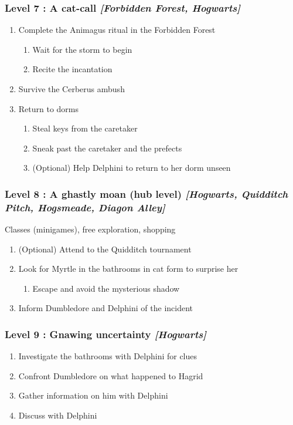 \subsubsection{Level 7 : A cat-call \textit{[Forbidden Forest, Hogwarts]}}
\begin{enumerate}[1)]
	\item Complete the Animagus ritual in the Forbidden Forest
	\begin{enumerate}[1.]
		\item Wait for the storm to begin
		\item Recite the incantation
	\end{enumerate}
	\item Survive the Cerberus ambush
	\item Return to dorms
	\begin{enumerate}[1.]
		\item Steal keys from the caretaker
		\item Sneak past the caretaker and the prefects
		\item (Optional) Help Delphini to return to her dorm unseen
	\end{enumerate}
\end{enumerate}

\subsubsection{Level 8 : A ghastly moan (hub level) \textit{[Hogwarts, Quidditch Pitch, Hogsmeade, Diagon Alley]}}

Classes (minigames), free exploration, shopping

\begin{enumerate}[1)]
	\item (Optional) Attend to the Quidditch tournament
	\item Look for Myrtle in the bathrooms in cat form to surprise her
	\begin{enumerate}[1.]
		\item Escape and avoid the mysterious shadow
	\end{enumerate}
	\item Inform Dumbledore and Delphini of the incident
\end{enumerate}

\subsubsection{Level 9 : Gnawing uncertainty \textit{[Hogwarts]}}
\begin{enumerate}[1)]
	\item Investigate the bathrooms with Delphini for clues
	\item Confront Dumbledore on what happened to Hagrid
	\item Gather information on him with Delphini
	\item Discuss with Delphini
\end{enumerate}

